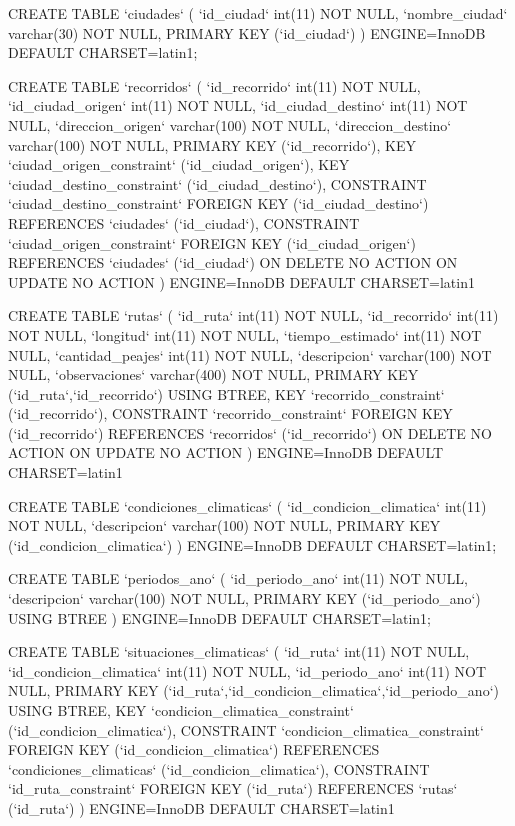 \begin{sql}
CREATE TABLE  `ciudades` (
  `id_ciudad` int(11) NOT NULL,
  `nombre_ciudad` varchar(30) NOT NULL,
  PRIMARY KEY (`id_ciudad`)
) ENGINE=InnoDB DEFAULT CHARSET=latin1;

CREATE TABLE  `recorridos` (
  `id_recorrido` int(11) NOT NULL,
  `id_ciudad_origen` int(11) NOT NULL,
  `id_ciudad_destino` int(11) NOT NULL,
  `direccion_origen` varchar(100) NOT NULL,
  `direccion_destino` varchar(100) NOT NULL,
  PRIMARY KEY (`id_recorrido`),
  KEY `ciudad_origen_constraint` (`id_ciudad_origen`),
  KEY `ciudad_destino_constraint` (`id_ciudad_destino`),
  CONSTRAINT `ciudad_destino_constraint` FOREIGN KEY (`id_ciudad_destino`) REFERENCES `ciudades` (`id_ciudad`),
  CONSTRAINT `ciudad_origen_constraint` FOREIGN KEY (`id_ciudad_origen`) REFERENCES `ciudades` (`id_ciudad`) ON DELETE NO ACTION ON UPDATE NO ACTION
) ENGINE=InnoDB DEFAULT CHARSET=latin1

CREATE TABLE  `rutas` (
  `id_ruta` int(11) NOT NULL,
  `id_recorrido` int(11) NOT NULL,
  `longitud` int(11) NOT NULL,
  `tiempo_estimado` int(11) NOT NULL,
  `cantidad_peajes` int(11) NOT NULL,
  `descripcion` varchar(100) NOT NULL,
  `observaciones` varchar(400) NOT NULL,
  PRIMARY KEY (`id_ruta`,`id_recorrido`) USING BTREE,
  KEY `recorrido_constraint` (`id_recorrido`),
  CONSTRAINT `recorrido_constraint` FOREIGN KEY (`id_recorrido`) REFERENCES `recorridos` (`id_recorrido`) ON DELETE NO ACTION ON UPDATE NO ACTION
) ENGINE=InnoDB DEFAULT CHARSET=latin1

CREATE TABLE  `condiciones_climaticas` (
  `id_condicion_climatica` int(11) NOT NULL,
  `descripcion` varchar(100) NOT NULL,
  PRIMARY KEY (`id_condicion_climatica`)
) ENGINE=InnoDB DEFAULT CHARSET=latin1;

CREATE TABLE  `periodos_ano` (
  `id_periodo_ano` int(11) NOT NULL,
  `descripcion` varchar(100) NOT NULL,
  PRIMARY KEY (`id_periodo_ano`) USING BTREE
) ENGINE=InnoDB DEFAULT CHARSET=latin1;

CREATE TABLE  `situaciones_climaticas` (
  `id_ruta` int(11) NOT NULL,
  `id_condicion_climatica` int(11) NOT NULL,
  `id_periodo_ano` int(11) NOT NULL,
  PRIMARY KEY (`id_ruta`,`id_condicion_climatica`,`id_periodo_ano`) USING BTREE,
  KEY `condicion_climatica_constraint` (`id_condicion_climatica`),
  CONSTRAINT `condicion_climatica_constraint`
   FOREIGN KEY (`id_condicion_climatica`) REFERENCES `condiciones_climaticas` (`id_condicion_climatica`),
  CONSTRAINT `id_ruta_constraint` FOREIGN KEY (`id_ruta`) REFERENCES `rutas` (`id_ruta`)
) ENGINE=InnoDB DEFAULT CHARSET=latin1
\end{sql}


